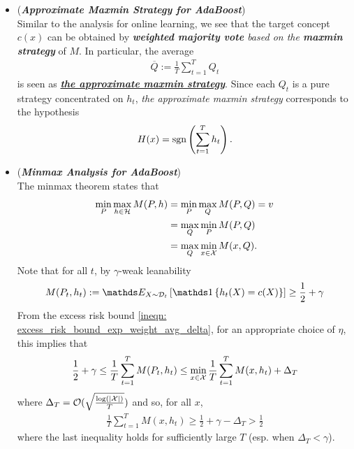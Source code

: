 \documentclass[11pt]{article}
\begin{document}
\begin{itemize}
\item \begin{remark}(\textbf{\emph{Approximate Maxmin Strategy for AdaBoost}})\\
 Similar to the analysis for online learning, we see that the target concept $c(x)$ can be obtained by \emph{\textbf{weighted majority vote} based on the \textbf{maxmin strategy}} of $M$. In particular, the average
\begin{align*}
\overline{Q} := \frac{1}{T}\sum_{t=1}^{T}Q_t
\end{align*} is seen as \underline{\emph{\textbf{the approximate maxmin strategy}}}. Since each $Q_t$ is a pure strategy concentrated on $h_t$, \emph{the approximate maxmin strategy} corresponds to the hypothesis
\begin{align*}
H(x) = \text{sgn}\left(\sum_{t=1}^{T}h_t\right).
\end{align*}
\end{remark}

\item \begin{remark}(\textbf{\emph{Minmax Analysis for AdaBoost}}) \citep{schapire2012boosting}\\
The minmax theorem states that
\begin{align}
\min_{P}\max_{h \in {\mathcal H}}M(P, h) &= \min_{P}\max_{Q}M(P, Q) = v \nonumber\\
&= \max_{Q}\min_{P}M(P, Q) \nonumber\\
&= \max_{Q}\min_{x \in {\mathcal X}}M(x, Q). \label{eqn: minmax_boost}
\end{align} Note that for all $t$, by $\gamma$-weak leanability
\begin{align*}
M(P_t, h_t) := \E{X\sim\cD_t}{\ind{h_t(X) = c(X)}} \ge \frac{1}{2} + \gamma
\end{align*} From the excess risk bound \eqref{ineqn: excess_risk_bound_exp_weight_avg_delta}, for an appropriate choice of $\eta$, this implies that
\begin{align}
 \frac{1}{2} + \gamma \le \frac{1}{T}\sum_{t=1}^{T}M(P_t, h_t)  \le \min_{x \in {\mathcal X}}\frac{1}{T}\sum_{t=1}^{T}M(x, h_t) + \Delta_T  \label{ineqn: excess_risk_bound_adaboost}
\end{align} where $\Delta_T = {\mathcal O}(\sqrt{\frac{\log (\left\lvert {\mathcal X} \right\rvert)}{T}})$ and so, for all $x$,
\begin{align}
\frac{1}{T}\sum_{t=1}^{T}M(x, h_t)  \ge  \frac{1}{2} + \gamma - \Delta_T > \frac{1}{2} \label{ineqn: excess_risk_bound_adaboost2}
\end{align} where the last inequality holds for sufficiently large $T$ (esp. when $\Delta_T < \gamma$). 


\end{remark}
\end{itemize}
\end{document}
